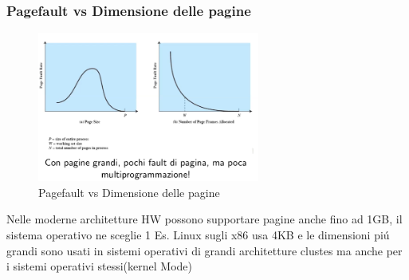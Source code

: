     \subsubsection*{Pagefault vs Dimensione delle pagine}
    \begin{figure}[H]
        \centering
        \includegraphics[width=0.65\textwidth]{immagini/Grafico1}
        \caption{Pagefault vs Dimensione delle pagine}
    \end{figure}
    Nelle moderne architetture HW possono supportare pagine anche fino ad 1GB, il sistema operativo
    ne sceglie 1 Es. Linux sugli x86 usa 4KB e le dimensioni piú grandi sono usati in sistemi operativi di grandi architetture
    clustes \ldotsecc ma anche per i sistemi operativi stessi(kernel Mode)












































